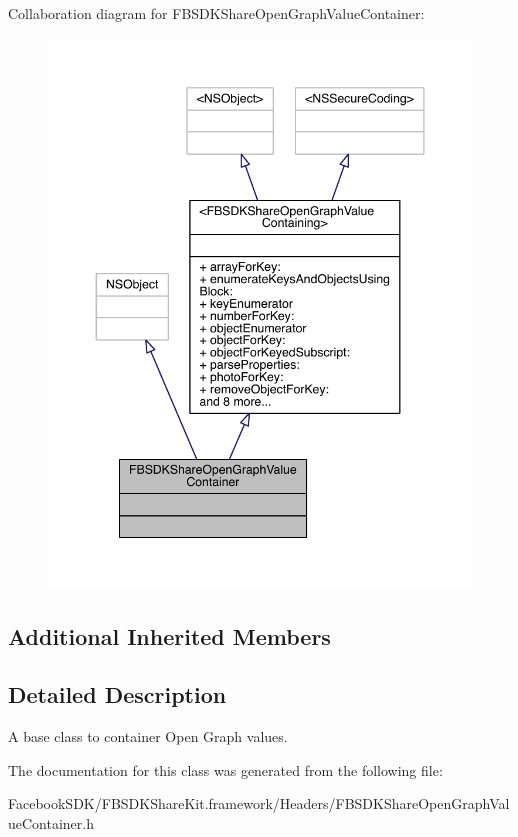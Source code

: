 Collaboration diagram for F\-B\-S\-D\-K\-Share\-Open\-Graph\-Value\-Container\-:
\nopagebreak
\begin{figure}[H]
\begin{center}
\leavevmode
\includegraphics[width=347pt]{interface_f_b_s_d_k_share_open_graph_value_container__coll__graph}
\end{center}
\end{figure}
\subsection*{Additional Inherited Members}


\subsection{Detailed Description}
A base class to container Open Graph values. 

The documentation for this class was generated from the following file\-:\begin{DoxyCompactItemize}
\item 
Facebook\-S\-D\-K/\-F\-B\-S\-D\-K\-Share\-Kit.\-framework/\-Headers/F\-B\-S\-D\-K\-Share\-Open\-Graph\-Value\-Container.\-h\end{DoxyCompactItemize}
